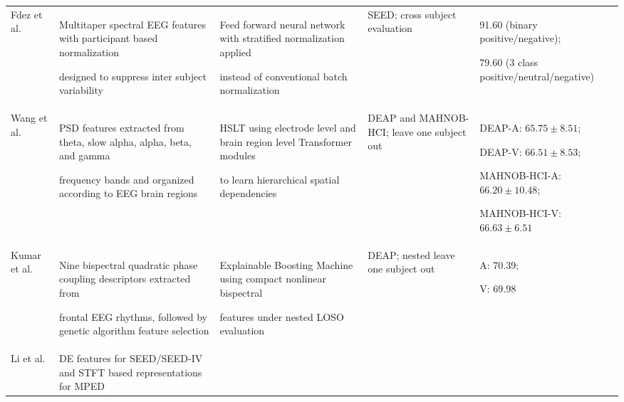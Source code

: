 \documentclass[ASNA,twocolumn]{USG}
\newcommand{\lightrowsep}{%
  \arrayrulecolor{lightrowgray}%
  \specialrule{0.30pt}{3.5pt}{3.5pt}%
  \arrayrulecolor{black}%
}
\begin{document}
\begin{table}
\begin{tabularx}{\textheight}{>{\raggedright\arraybackslash}p{3.15cm}>{\raggedright\arraybackslash}X>{\raggedright\arraybackslash}X>{\raggedright\arraybackslash}p{3.45cm}>{\raggedright\arraybackslash}p{5.0cm}}
Fdez et al. \cite{fdez2021cross} &

Multitaper spectral EEG features with participant based normalization

designed to suppress inter subject variability &

Feed forward neural network with stratified normalization applied

instead of conventional batch normalization &

SEED; cross subject evaluation &

91.60 (binary positive/negative);

79.60 (3 class positive/neutral/negative) \\

\lightrowsep

Wang et al. \cite{wang2022transformers} &

PSD features extracted from theta, slow alpha, alpha, beta, and gamma

frequency bands and organized according to EEG brain regions &

HSLT using electrode level and brain region level Transformer modules

to learn hierarchical spatial dependencies &

DEAP and MAHNOB-HCI; leave one subject out &

DEAP-A: $65.75 \pm 8.51$;

DEAP-V: $66.51 \pm 8.53$;

MAHNOB-HCI-A: $66.20 \pm 10.48$;

MAHNOB-HCI-V: $66.63 \pm 6.51$ \\

\lightrowsep

Kumar et al. \cite{kumar2026subject} &

Nine bispectral quadratic phase coupling descriptors extracted from

frontal EEG rhythms, followed by genetic algorithm feature selection &

Explainable Boosting Machine using compact nonlinear bispectral

features under nested LOSO evaluation &

DEAP; nested leave one subject out &

A: 70.39;

V: 69.98 \\

\lightrowsep

Li et al. \cite{li2022gmss} &

DE features for SEED/SEED-IV and STFT based representations for MPED &


\end{tabularx}
\end{table}
\end{document}
